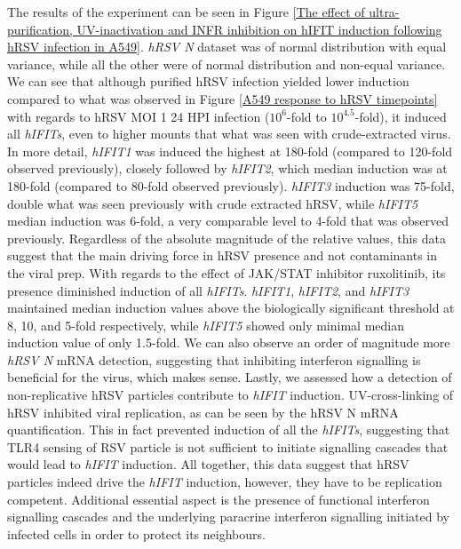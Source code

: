 The results of the experiment can be seen in Figure \ref{The effect of ultra-purification, UV-inactivation and INFR inhibition on hIFIT induction following hRSV infection in A549}. \textit{hRSV N} dataset was of normal distribution with equal variance, while all the other were of normal distribution and non-equal variance. We can see that although purified hRSV infection yielded lower induction compared to what was observed in Figure \ref{A549 response to hRSV timepoints} with regards to hRSV MOI 1 24 HPI infection (\(10^6\)-fold to \(10^{4.5}\)-fold), it induced all \textit{hIFITs}, even to higher mounts that what was seen with crude-extracted virus. In more detail, \textit{hIFIT1} was induced the highest at 180-fold (compared to 120-fold observed previously), closely followed by \textit{hIFIT2}, which median induction was at 180-fold (compared to 80-fold observed previously). \textit{hIFIT3} induction was 75-fold, double what was seen previously with crude extracted hRSV, while \textit{hIFIT5} median induction was 6-fold, a very comparable level to 4-fold that was observed previously. Regardless of the absolute magnitude of the relative values, this data suggest that the main driving force in hRSV presence and not contaminants in the viral prep. With regards to the effect of JAK/STAT inhibitor ruxolitinib, its presence diminished induction of all \textit{hIFITs}. \textit{hIFIT1}, \textit{hIFIT2}, and \textit{hIFIT3} maintained median induction values above the biologically significant threshold at 8, 10, and 5-fold respectively, while \textit{hIFIT5} showed only minimal median induction value of only 1.5-fold. We can also observe an order of magnitude more \textit{hRSV N} mRNA detection, suggesting that inhibiting interferon signalling is beneficial for the virus, which makes sense. Lastly, we assessed how a detection of non-replicative hRSV particles contribute to \textit{hIFIT} induction. UV-cross-linking of hRSV inhibited viral replication, as can be seen by the {hRSV N} mRNA quantification. This in fact prevented induction of all the \textit{hIFITs}, suggesting that TLR4 sensing of RSV particle is not sufficient to initiate signalling cascades that would lead to \textit{hIFIT} induction. All together, this data suggest that hRSV particles indeed drive the \textit{hIFIT} induction, however, they have to be replication competent. Additional essential aspect is the presence of functional interferon signalling cascades and the underlying paracrine interferon signalling initiated by infected cells in order to protect its neighbours.

